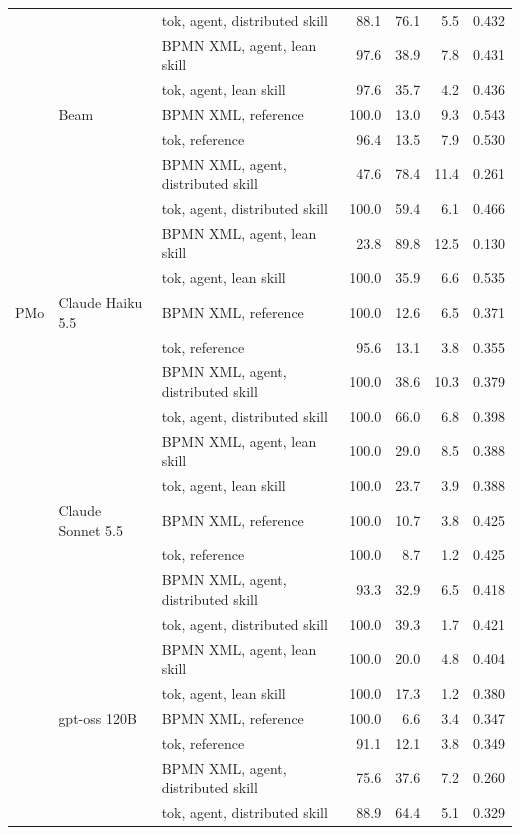 \documentclass[11pt,a4paper]{article}
\begin{document}
\begin{table}[tp]
\begin{tabular}{@{}l l l r r r r@{}}
 &  & tok, agent, distributed skill & 88.1 & 76.1 & 5.5 & 0.432\\
 &  & BPMN XML, agent, lean skill & 97.6 & 38.9 & 7.8 & 0.431\\
 &  & tok, agent, lean skill & 97.6 & 35.7 & 4.2 & 0.436\\
\addlinespace
 & Beam & BPMN XML, reference & 100.0 & 13.0 & 9.3 & 0.543\\
 &  & tok, reference & 96.4 & 13.5 & 7.9 & 0.530\\
 &  & BPMN XML, agent, distributed skill & 47.6 & 78.4 & 11.4 & 0.261\\
 &  & tok, agent, distributed skill & 100.0 & 59.4 & 6.1 & 0.466\\
 &  & BPMN XML, agent, lean skill & 23.8 & 89.8 & 12.5 & 0.130\\
 &  & tok, agent, lean skill & 100.0 & 35.9 & 6.6 & 0.535\\
\midrule
PMo & Claude Haiku 5.5 & BPMN XML, reference & 100.0 & 12.6 & 6.5 & 0.371\\
 &  & tok, reference & 95.6 & 13.1 & 3.8 & 0.355\\
 &  & BPMN XML, agent, distributed skill & 100.0 & 38.6 & 10.3 & 0.379\\
 &  & tok, agent, distributed skill & 100.0 & 66.0 & 6.8 & 0.398\\
 &  & BPMN XML, agent, lean skill & 100.0 & 29.0 & 8.5 & 0.388\\
 &  & tok, agent, lean skill & 100.0 & 23.7 & 3.9 & 0.388\\
\addlinespace
 & Claude Sonnet 5.5 & BPMN XML, reference & 100.0 & 10.7 & 3.8 & 0.425\\
 &  & tok, reference & 100.0 & 8.7 & 1.2 & 0.425\\
 &  & BPMN XML, agent, distributed skill & 93.3 & 32.9 & 6.5 & 0.418\\
 &  & tok, agent, distributed skill & 100.0 & 39.3 & 1.7 & 0.421\\
 &  & BPMN XML, agent, lean skill & 100.0 & 20.0 & 4.8 & 0.404\\
 &  & tok, agent, lean skill & 100.0 & 17.3 & 1.2 & 0.380\\
\addlinespace
 & gpt-oss 120B & BPMN XML, reference & 100.0 & 6.6 & 3.4 & 0.347\\
 &  & tok, reference & 91.1 & 12.1 & 3.8 & 0.349\\
 &  & BPMN XML, agent, distributed skill & 75.6 & 37.6 & 7.2 & 0.260\\
 &  & tok, agent, distributed skill & 88.9 & 64.4 & 5.1 & 0.329\\

\end{tabular}
\end{table}
\end{document}
